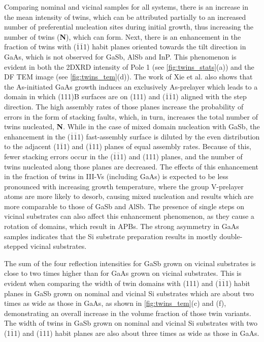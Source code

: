 Comparing nominal and vicinal samples for all systems, there is an increase in the mean intensity of twins, which can be attributed partially to an increased number of preferential nucleation sites during initial growth, thus increasing the number of twins (\textbf{N}), which can form.
Next, there is an enhancement in the fraction of twins with
(\(\overline{1}\overline{1}\)1)
habit planes oriented towards the tilt direction in GaAs, which is not observed for GaSb, AlSb and InP\@. This phenomenon is evident in both the 2DXRD intensity of Pole 1 (see \cref{fig:twins_stats}(a)) and the DF TEM image (see \cref{fig:twins_tem}(d)).
The work of Xie et al.
also shows that the As-initiated GaAs growth induces an exclusively As-prelayer which leads to a domain in which (111)B surfaces are on (111) and
(\(\overline{1}\overline{1}\)1)
aligned with the step direction.
The high assembly rates of those planes increase the probability of errors in the form of stacking faults, which, in turn, increases the total number of twins nucleated, \textbf{N}.
While in the case of mixed domain nucleation with GaSb, the enhancement in the
(\(\overline{1}\overline{1}\)1)
fast-assembly surface is diluted by the even distribution to the adjacent (1\(\overline{1}\)1) and (\(\overline{1}\)11) planes of equal assembly rates.
Because of this, fewer stacking errors occur in the
(\(\overline{1}\overline{1}\)1)
and (111) planes, and the number of twins nucleated along those planes are decreased.
The effects of this enhancement in the fraction of twins in III-Vs (including GaAs) is expected to be less pronounced with increasing growth temperature, where the group V-prelayer atoms are more likely to desorb, causing mixed nucleation and results which are more comparable to those of GaSb and AlSb.
The presence of single steps on vicinal substrates can also affect this enhancement phenomenon, as they cause a rotation of domains, which result in APBs.
The strong asymmetry in GaAs samples indicates that the Si substrate preparation results in mostly double-stepped vicinal substrates.

The sum of the four reflection intensities for GaSb grown on vicinal substrates is close to two times higher than for GaAs grown on vicinal substrates.
This is evident when comparing the width of twin domains with (111) and
(\(\overline{1}\overline{1}\)1)
habit planes in GaSb grown on nominal and vicinal Si substrates which are about two times as wide as those in GaAs, as shown in \cref{fig:twins_tem}(c) and (f), demonstrating an overall increase in the volume fraction of those twin variants.
The width of twins in GaSb grown on nominal and vicinal Si substrates with two (1\(\overline{1}\)1) and (\(\overline{1}\)11) habit planes are also about three times as wide as those in GaAs.

